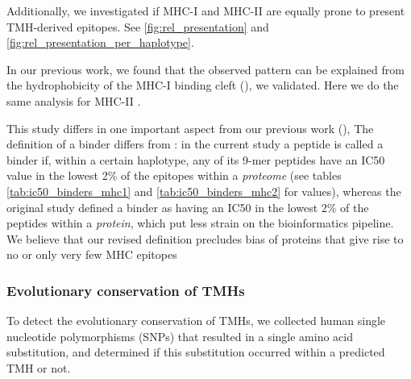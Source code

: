 Additionally, we investigated if MHC-I and MHC-II are equally prone
to present TMH-derived epitopes. 
See \ref{fig:rel_presentation} and \ref{fig:rel_presentation_per_haplotype}.

In our previous work, we found that the observed pattern can be
explained from the hydrophobicity of the MHC-I binding 
cleft (\cite{bianchi2017}), we validated.
Here we do the same analysis for MHC-II .

This study differs in one important aspect from our previous work (\cite{bianchi2017}), 
The definition of a binder differs from \cite{bianchi2017}:
in the current study a peptide is called a binder if, within a certain haplotype, 
any of its 9-mer peptides have an IC50 value in the lowest 2\% of 
the epitopes within a 
\emph{proteome} (see tables \ref{tab:ic50_binders_mhc1} and \ref{tab:ic50_binders_mhc2}
for values), whereas the original study defined
a binder as having an IC50 in the lowest 2\% 
of the peptides within a \emph{protein}, 
which put less strain on the bioinformatics pipeline.
We believe that our revised definition precludes bias of proteins 
that give rise to no or only very few MHC epitopes




\subsubsection{Evolutionary conservation of TMHs}


To detect the evolutionary conservation of TMHs,
we collected human single nucleotide polymorphisms (SNPs)
that resulted in a single amino acid substitution,
and determined if this substitution occurred within a predicted TMH or not.


